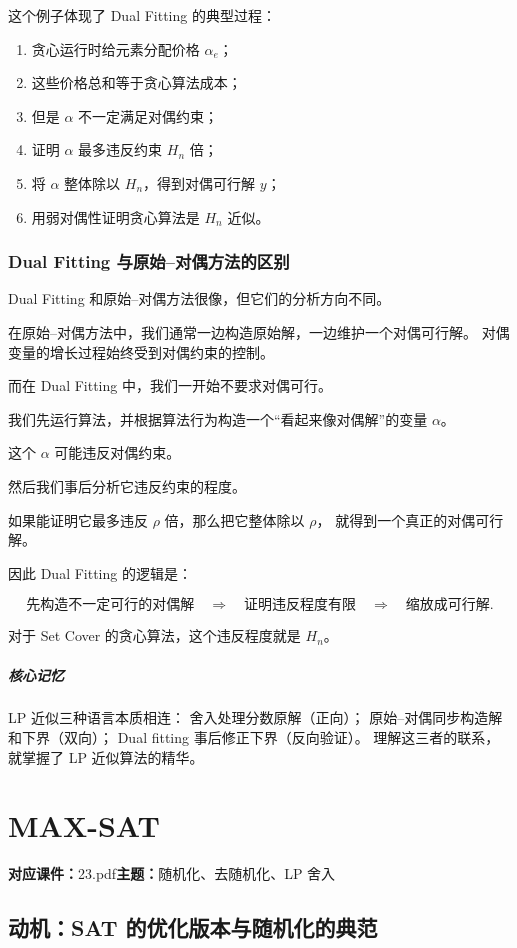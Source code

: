\documentclass[UTF8,openany,12pt]{ctexbook}
\theoremstyle{remark}
\newcommand{\lecture}[3]{
  \chapter{#2}
  \noindent\textbf{对应课件：}#1\hfill\textbf{主题：}#3
  \vspace{0.6em}
}
\newcommand{\keypoint}[1]{\paragraph{核心记忆}#1}
\begin{document}
这个例子体现了 Dual Fitting 的典型过程：

\begin{enumerate}
  \item 贪心运行时给元素分配价格 $\alpha_e$；
  \item 这些价格总和等于贪心算法成本；
  \item 但是 $\alpha$ 不一定满足对偶约束；
  \item 证明 $\alpha$ 最多违反约束 $H_n$ 倍；
  \item 将 $\alpha$ 整体除以 $H_n$，得到对偶可行解 $y$；
  \item 用弱对偶性证明贪心算法是 $H_n$ 近似。
\end{enumerate}

\subsection{Dual Fitting 与原始--对偶方法的区别}

Dual Fitting 和原始--对偶方法很像，但它们的分析方向不同。

在原始--对偶方法中，我们通常一边构造原始解，一边维护一个对偶可行解。
对偶变量的增长过程始终受到对偶约束的控制。

而在 Dual Fitting 中，我们一开始不要求对偶可行。

我们先运行算法，并根据算法行为构造一个“看起来像对偶解”的变量
$\alpha$。

这个 $\alpha$ 可能违反对偶约束。

然后我们事后分析它违反约束的程度。

如果能证明它最多违反 $\rho$ 倍，那么把它整体除以 $\rho$，
就得到一个真正的对偶可行解。

因此 Dual Fitting 的逻辑是：

\[
  \text{先构造不一定可行的对偶解}
  \quad\Longrightarrow\quad
  \text{证明违反程度有限}
  \quad\Longrightarrow\quad
  \text{缩放成可行解}.
\]

对于 Set Cover 的贪心算法，这个违反程度就是 $H_n$。

\keypoint{
  LP 近似三种语言本质相连：
  舍入处理分数原解（正向）；
  原始--对偶同步构造解和下界（双向）；
  Dual fitting 事后修正下界（反向验证）。
  理解这三者的联系，就掌握了 LP 近似算法的精华。
}

\lecture{23.pdf}{MAX-SAT}{随机化、去随机化、LP 舍入}

\section*{动机：SAT 的优化版本与随机化的典范}
\end{document}
